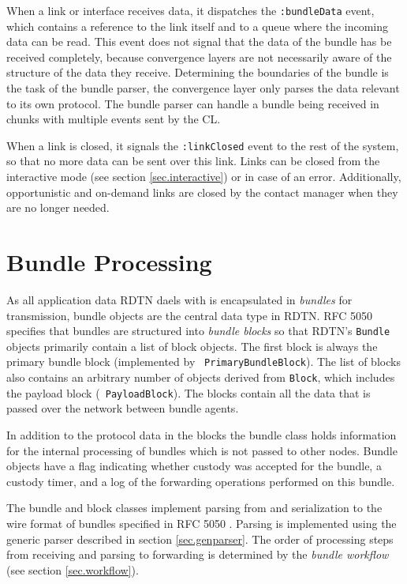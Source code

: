 \documentclass[a4paper]{article}
\begin{document}
When a link or interface receives data, it dispatches the {\tt :bundleData}
event, which contains a reference to the link itself and to a queue where the
incoming data can be read. This event does not signal that the data of the
bundle has be received completely, because convergence layers are not
necessarily aware of the structure of the data they receive. Determining the
boundaries of the bundle is the task of the bundle parser, the convergence layer
only parses the data relevant to its own protocol. The bundle parser can
handle a bundle being received in chunks with multiple events sent by
the CL.

When a link is closed, it signals the {\tt :linkClosed} event to the rest of the
system, so that no more data can be sent over this link. Links can be closed
from the interactive mode (see section \ref{sec.interactive}) or in case of an
error. Additionally, opportunistic and on-demand links are closed by the contact
manager when they are no longer needed.

\section{Bundle Processing}\label{sec.bundle-proc}

As all application data RDTN daels with is encapsulated in {\em bundles} for
transmission, bundle objects are the central data type in RDTN. RFC 5050
\cite{bundle-spec} specifies that bundles are structured into {\em bundle
blocks} so that RDTN's {\tt Bundle} objects primarily contain a list of block
objects. The first block is always the primary bundle block (implemented by {\tt
PrimaryBundleBlock}). The list of blocks also contains an arbitrary number of
objects derived from {\tt Block}, which includes the payload block ({\tt
PayloadBlock}). The blocks contain all the data that is passed over the network
between bundle agents. 

In addition to the protocol data in the blocks the bundle class holds
information for the internal processing of bundles which is not passed to other
nodes.  Bundle objects have a flag indicating whether custody was accepted for
the bundle, a custody timer, and a log of the forwarding operations performed on
this bundle.

The bundle and block classes implement parsing from and serialization to the
wire format of bundles specified in RFC 5050 \cite{bundle-spec}. Parsing is
implemented using the generic parser described in section \ref{sec.genparser}.
The order of processing steps from receiving and parsing to forwarding is
determined by the {\em bundle workflow} (see section \ref{sec.workflow}).
\end{document}
